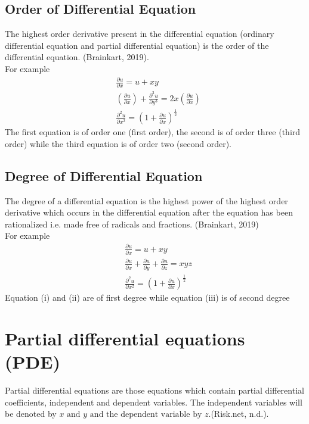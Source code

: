 \documentclass[12pt]{report}
\begin{document}
\subsection{Order of Differential Equation}
\qquad The highest order derivative present in the differential equation (ordinary differential equation and partial differential equation) is the order of the differential equation. (Brainkart, 2019).
\\
For example
\begin{align*}
& \frac{\partial u}{\partial x}=u+xy \tag{i}\\
& \left (\frac{\partial u}{\partial x}\right)+ \frac{\partial^3u}{\partial y^3}=2x\left(\frac{\partial u}{\partial x}\right) \tag{ii} \\
& \frac{\partial^2u}{\partial x^2}=\left(1+\frac{\partial u}{\partial x}\right)^{\frac{1}{2}}\tag{iii}
\end{align*}
The first equation is of order one (first order), the second is of order three (third order) while the third equation is of order two (second order).
\subsection{Degree of Differential Equation}
\qquad The degree of a differential equation is the highest power of  the highest order derivative which occurs in the differential equation after the equation has been rationalized i.e. made free of radicals and fractions. (Brainkart, 2019)\\
For example
\begin{align*}
& \frac{\partial u}{\partial x}=u+xy\tag{i}\\
& \frac{\partial u}{\partial x}+ \frac{\partial u}{\partial y}+\frac{\partial u}{\partial z}=xyz\tag{ii}\\
& \frac{\partial^2u}{\partial x^2}=\left(1+\frac{\partial u}{\partial x}\right)^{\frac{1}{2}}\tag{iii}
\end{align*}
Equation (i) and (ii) are of first degree while equation (iii) is of second degree
\section{Partial differential equations (PDE)}
Partial differential equations are those equations which contain partial differential coefficients, independent and dependent variables. The independent variables will be denoted by $x \mbox{ and } y \mbox{ and the dependent variable by } z$.(Risk.net, n.d.).\\
\end{document}
